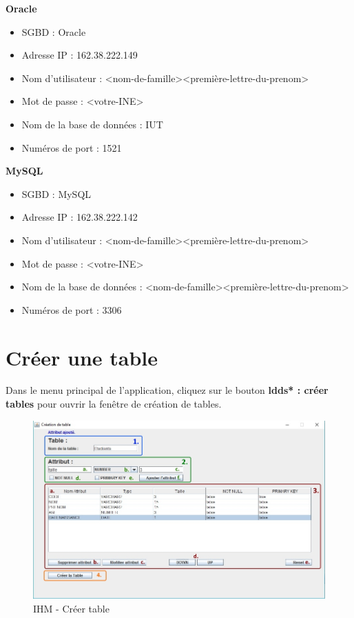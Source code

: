 \textbf{Oracle}
\begin{itemize}
\item SGBD : Oracle
\item Adresse IP : 162.38.222.149
\item Nom d'utilisateur : <nom-de-famille><première-lettre-du-prenom>
\item Mot de passe : <votre-INE>
\item Nom de la base de données : IUT
\item Numéros de port : 1521 \\
\end{itemize}

\textbf{MySQL}
\begin{itemize}
\item SGBD : MySQL
\item Adresse IP : 162.38.222.142
\item Nom d'utilisateur : <nom-de-famille><première-lettre-du-prenom>
\item Mot de passe : <votre-INE>
\item Nom de la base de données : <nom-de-famille><première-lettre-du-prenom>
\item Numéros de port : 3306
\end{itemize}

\section{Créer une table}
Dans le menu principal de l'application, cliquez sur le bouton \textbf{\glspl{ldd}* : créer tables} pour ouvrir la fen\^etre de création de tables.

\begin{figure}[!h]
\centering
\includegraphics[width=14cm]{./images/manuel/creer_table.jpg}
\caption{IHM - Créer table}
\label{creer_table}
\end{figure}

